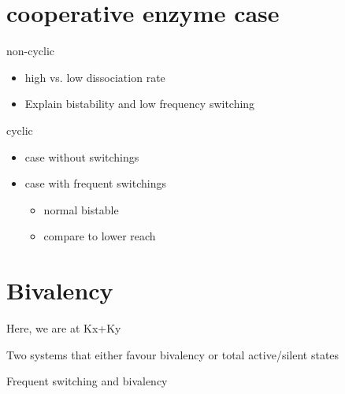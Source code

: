     \section{cooperative enzyme case}
        \begin{itemize}
            {
                \color{red}
                        \item non-cyclic
                            \begin{itemize}
                                \item high vs. low dissociation rate
                                \item Explain bistability and low frequency switching
                            \end{itemize}
                        \item cyclic
                            \begin{itemize}
                                \item case without switchings
                                \item case with frequent switchings
                                    \begin{itemize}
                                        \item normal bistable
                                        \item compare to lower reach
                                    \end{itemize}
                            \end{itemize}
            }
        \end{itemize}
    \section{Bivalency} %
        \begin{itemize}
            {
                \color{red}
                \item Here, we are at Kx+Ky
                \item Two systems that either favour bivalency or total active/silent states
                \item Frequent switching and bivalency
            }
        \end{itemize}

